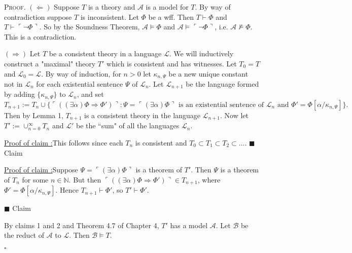 \documentclass[12pt]{article}
\newcounter{ProofCounter}
\newcounter{ClaimCounter}[ProofCounter]
\newenvironment{Proof}{\stepcounter{ProofCounter}\textsc{Proof.}}{\hfill$\square$}
\newenvironment{claim}[1]{\vspace{1mm}\stepcounter{ClaimCounter}\par\noindent\underline{\bf Claim \theClaimCounter:}\space#1}{}
\newenvironment{claimproof}[1]{\par\noindent\underline{Proof of claim \theClaimCounter:}\space#1}{\hfill $\blacksquare$ Claim \theClaimCounter}
\begin{document}
\begin{Proof}
  $(\Leftarrow)$ Suppose $T$ is a theory and $\mathcal{A}$ is a model for $T$. By way of contradiction suppose $T$ is inconsistent. Let $\Phi$ be a
  wff. Then $T \vdash \Phi$ and $T \vdash \ulcorner \neg \Phi \urcorner$. So by the Soundness Theorem, $\mathcal{A} \models \Phi$ and $\mathcal{A}
  \models \ulcorner \neg \Phi \urcorner$, i.e. $\mathcal{A} \not \models \Phi$. This is a contradiction.

  $(\Rightarrow)$ Let $T$ be a consistent theory in a language $\mathcal{L}$. We will inductively construct a "maximal" theory $T'$ which is
  consistent and has witnesses.
  Let $T_0 = T$ and $\mathcal{L}_0 = \mathcal{L}$. By way of induction, for $n > 0$ let $\kappa_{n,\Psi}$ be a new unique constant not in $\mathcal{L}_n$
  for each existential sentence $\Psi$ of $\mathcal{L}_n$. Let $\mathcal{L}_{n+1}$ be the language formed by adding $\{ \kappa_{n,\Psi} \}$ to
  $\mathcal{L}_n$, and set
  \[
    T_{n+1} := T_n \cup \{ \ulcorner ((\exists \alpha) \Phi \Rightarrow \Phi') \urcorner : \Psi = \ulcorner (\exists \alpha) \Phi \urcorner \text{ is an
    existential sentence of $\mathcal{L}_n$ and $\Phi' = \Phi[\alpha / \kappa_{n,\Psi}]$} \}.
  \]
  Then by Lemma 1, $T_{n+1}$ is
  a consistent theory in the language $\mathcal{L}_{n+1}$. Now let $T' := \cup_{n=0}^{\infty} T_{n}$ and $\mathcal{L}'$ be the ``sum" of all the languages
  $\mathcal{L}_n$.

  \begin{claimproof}
    This follows since each $T_{n}$ is consistent and $T_0 \subset T_1 \subset T_2 \subset \dots$.
  \end{claimproof}

  \begin{claimproof}
    Suppose $\Psi = \ulcorner (\exists \alpha) \Phi \urcorner$ is a theorem of $T'$. Then $\Psi$ is a theorem of $T_n$ for some $n \in \mathbb{N}$.
    But then $\ulcorner ((\exists \alpha) \Phi \Rightarrow \Phi') \urcorner \in T_{n+1}$, where $\Phi' = \Phi[\alpha / \kappa_{n,\Psi}]$. Hence
    $T_{n+1} \vdash \Phi'$, so $T' \vdash \Phi'$.

  \end{claimproof}

  By claims 1 and 2 and Theorem 4.7 of Chapter 4, $T'$ has a model $\mathcal{A}$. Let $\mathcal{B}$ be the reduct of $\mathcal{A}$ to $\mathcal{L}$.
  Then $\mathcal{B} \models T$.
  
\end{Proof}
\end{document}

